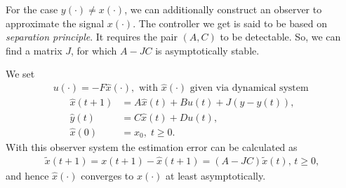 
%
%
%

For the case $y(\cdot) \neq x(\cdot)$, we can additionally construct an observer to approximate the signal $x(\cdot)$. The  controller we get is said to be based on \textit{separation principle}.
It requires the pair $(A,C)$ to be detectable. So, we can find a matrix $J$, for which $A - JC$ is asymptotically stable.

We set 
\begin{align}
u(\cdot)= -F \hat{x}(\cdot), \text{ with } \hat{x}(\cdot) \text{ given via dynamical system }
\end{align}
\begin{align}
\hat{x}(t+1) &= A\hat{x}(t) + B u(t) + J (y - \hat{y}(t)), \\
\hat{y}(t) & = C\hat{x}(t) + D u(t), \\
\hat{x}(0)& = x_0, \; t \geq 0. 
\end{align}
With this observer system the estimation error can be calculated as \begin{align}
\tilde{x}(t+1) = x(t+1) - \hat{x}(t+1) = (A - JC) \tilde{x}(t), \, t \geq 0,
\end{align} and hence $\hat{x} (\cdot)$ converges to $x(\cdot)$ at least asymptotically. 

